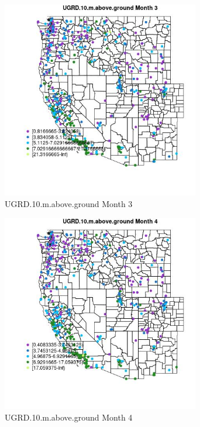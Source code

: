 \begin{figure} 
\centering  
\includegraphics[width=0.77\textwidth]{Code_Outputs/ML_input_report_ML_input_PM25_Step5_part_d_de_duplicated_aves_ML_input_MapObsMo3UGRD10maboveground.jpg} 
\caption{\label{fig:ML_input_report_ML_input_PM25_Step5_part_d_de_duplicated_aves_ML_inputMapObsMo3UGRD10maboveground}UGRD.10.m.above.ground Month 3} 
\end{figure} 
 

\begin{figure} 
\centering  
\includegraphics[width=0.77\textwidth]{Code_Outputs/ML_input_report_ML_input_PM25_Step5_part_d_de_duplicated_aves_ML_input_MapObsMo4UGRD10maboveground.jpg} 
\caption{\label{fig:ML_input_report_ML_input_PM25_Step5_part_d_de_duplicated_aves_ML_inputMapObsMo4UGRD10maboveground}UGRD.10.m.above.ground Month 4} 
\end{figure} 
 

